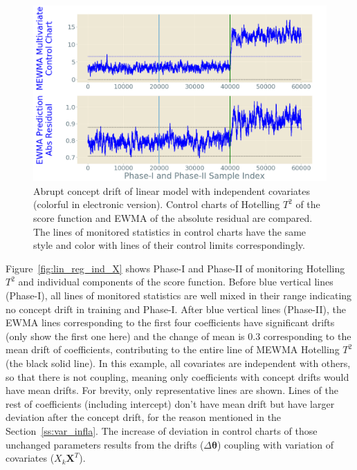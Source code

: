 \documentclass[twoside,11pt]{article}
\begin{document}
\begin{enumerate}[(I)]
\begin{figure}[!htp]
\centering
  \includegraphics[width = 0.6\linewidth]{../figures/v14/sim_2/reg/3_sim2_lin_1e-08_0_005_1.png}
  \caption{Abrupt concept drift of linear model with independent covariates (colorful in electronic version). Control charts of Hotelling $T^2$ of the score function and EWMA of the absolute residual are compared. The lines of monitored statistics in control charts have the same style and color with lines of their control limits correspondingly.}
  \label{fig:lin_reg_ind_X_comp}
\end{figure}

Figure~\ref{fig:lin_reg_ind_X} shows Phase-I and Phase-II of monitoring Hotelling $T^2$ and individual components of the score function. Before blue vertical lines (Phase-I), all lines of monitored statistics are well mixed in their range indicating no concept drift in training and Phase-I. After blue vertical lines (Phase-II), the EWMA lines corresponding to the first four coefficients have significant drifts (only show the first one here) and the change of mean is $0.3$ corresponding to the mean drift of coefficients, contributing to the entire line of MEWMA Hotelling $T^2$ (the black solid line). In this example, all covariates are independent with others, so that there is not coupling, meaning only coefficients with concept drifts would have mean drifts. For brevity, only representative lines are shown. Lines of the rest of coefficients (including intercept) don't have mean drift but have larger deviation after the concept drift, for the reason mentioned in the Section~\ref{ss:var_infla}. The increase of deviation in control charts of those unchanged parameters results from the drifts ($\Delta \bm { \theta}$) coupling with variation of covariates ($X_k\bm {X}^T$).


\end{enumerate}
\end{document}
